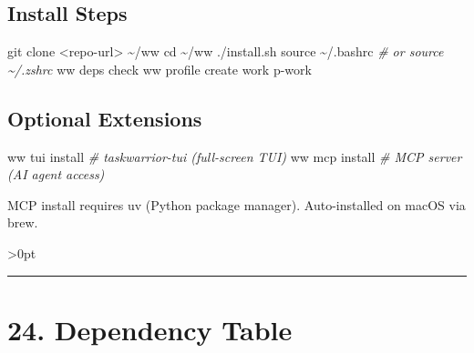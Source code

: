 \documentclass[11pt, a4paper, DIV=14]{scrartcl}
\renewcommand{\texttt}[1]{{\ttfamily\fontsize{8.5}{10.5}\selectfont\color{BabbNavy}#1}}
\newenvironment{Shaded}{%
  \vspace{4pt}%
  \begin{lrbox}{\ShadedBox}%
  \begin{minipage}{\dimexpr\linewidth-2\fboxsep\relax}%
  \vspace{4pt}%
}{%
  \vspace{4pt}%
  \end{minipage}%
  \end{lrbox}%
  \noindent\colorbox{CodeBg}{\usebox{\ShadedBox}}%
  \par\vspace{4pt}%
}
\newcommand{\BuiltInTok}[1]{\textcolor{BabbTeal}{#1}}
\newcommand{\CommentTok}[1]{\textcolor{BabbGray}{\textit{#1}}}
\newcommand{\ExtensionTok}[1]{#1}
\newcommand{\FunctionTok}[1]{\textcolor{BabbNavy}{#1}}
\newcommand{\NormalTok}[1]{#1}
\newcommand{\OperatorTok}[1]{#1}
\newenvironment{Highlighting}{\ttfamily\fontsize{8.2}{11}\selectfont}{}
\let\origRule\rule
\renewcommand{\rule}[3][0pt]{%
  \ifnum\dimexpr#3\relax>0pt
    \par\vspace{2pt}\noindent{\color{BabbBorder}\origRule[#1]{#2}{#3}}\par\vspace{2pt}%
  \else
    \origRule[#1]{#2}{#3}%
  \fi
}
\begin{document}
\subsection{Install Steps}\label{install-steps}

\begin{Shaded}
\begin{Highlighting}[]
\FunctionTok{git}\NormalTok{ clone }\OperatorTok{\textless{}}\NormalTok{repo{-}url}\OperatorTok{\textgreater{}}\NormalTok{ \textasciitilde{}/ww}
\BuiltInTok{cd}\NormalTok{ \textasciitilde{}/ww}
\ExtensionTok{./install.sh}
\BuiltInTok{source}\NormalTok{ \textasciitilde{}/.bashrc   }\CommentTok{\# or source \textasciitilde{}/.zshrc}
\ExtensionTok{ww}\NormalTok{ deps check}
\ExtensionTok{ww}\NormalTok{ profile create work}
\ExtensionTok{p{-}work}
\end{Highlighting}
\end{Shaded}

\subsection{Optional Extensions}\label{optional-extensions}

\begin{Shaded}
\begin{Highlighting}[]
\ExtensionTok{ww}\NormalTok{ tui install     }\CommentTok{\# taskwarrior{-}tui (full{-}screen TUI)}
\ExtensionTok{ww}\NormalTok{ mcp install     }\CommentTok{\# MCP server (AI agent access)}
\end{Highlighting}
\end{Shaded}

MCP install requires \texttt{uv} (Python package manager).
Auto-installed on macOS via brew.

\begin{center}\rule{0.5\linewidth}{0.5pt}\end{center}

\section{24. Dependency Table}\label{dependency-table}
\end{document}
